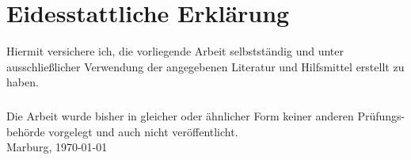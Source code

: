 \chapter*{Eidesstattliche Erklärung}

Hiermit versichere ich, die vorliegende Arbeit selbstständig und unter
ausschließlicher Verwendung der angegebenen Literatur und Hilfsmittel erstellt
zu haben.

\paragraph{}
Die Arbeit wurde bisher in gleicher oder ähnlicher Form keiner anderen
Prüfungs-behörde vorgelegt und auch nicht veröffentlicht.\\[2cm]
Marburg, \today

